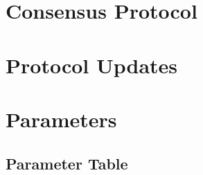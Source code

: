 \documentclass{article}
\begin{document}
\section{Consensus Protocol}
\label{section:DetailedConsensus}


\section{Protocol Updates}
\label{section:ProtocolUpdates}


\appendix

\section{Parameters}
\label{section:Appendix}
\subsection{Parameter Table}

\end{document}
